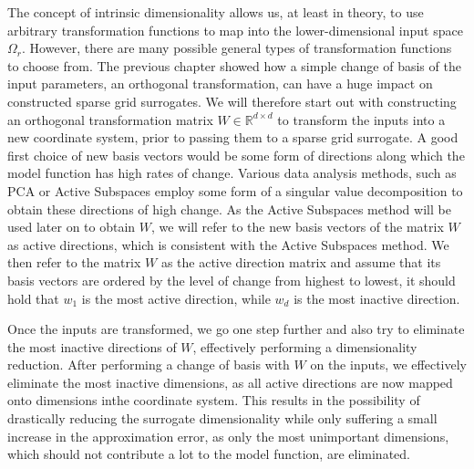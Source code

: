 \documentclass[
  a4paper,  %
  twoside,  %
  bibliography=totoc,
  headsepline,
  cleardoublepage=empty,
  parskip=half,
  draft=false
]{scrbook}
\begin{document}
The concept of intrinsic dimensionality allows us, at least in theory, to use arbitrary transformation functions to map into the lower-dimensional input space $\Omega_r$.
However, there are many possible general types of transformation functions to choose from.
The previous chapter showed how a simple change of basis of the input parameters, \ie an orthogonal transformation, can have a huge impact on constructed sparse grid surrogates.
We will therefore start out with constructing an orthogonal transformation matrix $W \in \mathds{R}^{d \times d}$ to transform the inputs into a new coordinate system, prior to passing them to a sparse grid surrogate.
A good first choice of new basis vectors would be some form of directions along which the model function has high rates of change.
Various data analysis methods, such as PCA \cite{} or Active Subspaces \cite{} employ some form of a singular value decomposition to obtain these directions of high change.
As the Active Subspaces method will be used later on to obtain $W$, we will refer to the new basis vectors of the matrix $W$ as active directions, which is consistent with the Active Subspaces method.
We then refer to the matrix $W$ as the active direction matrix and assume that its basis vectors are ordered by the level of change from highest to lowest, \ie it should hold that $w_1$ is the most active direction, while $w_d$ is the most inactive direction.

Once the inputs are transformed, we go one step further and also try to eliminate the most inactive directions of $W$, effectively performing a dimensionality reduction.
After performing a change of basis with $W$ on the inputs, we effectively eliminate the most inactive dimensions, as all active directions are now mapped onto dimensions inthe coordinate system.
This results in the possibility of drastically reducing the surrogate dimensionality while only suffering a small increase in the approximation error, as only the most unimportant dimensions, which should not contribute a lot to the model function, are eliminated.
\end{document}
